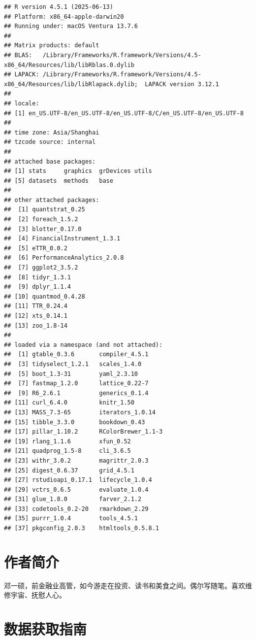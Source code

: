 \documentclass[]{ctexbook}
\begin{document}
\begin{verbatim}
## R version 4.5.1 (2025-06-13)
## Platform: x86_64-apple-darwin20
## Running under: macOS Ventura 13.7.6
## 
## Matrix products: default
## BLAS:   /Library/Frameworks/R.framework/Versions/4.5-x86_64/Resources/lib/libRblas.0.dylib 
## LAPACK: /Library/Frameworks/R.framework/Versions/4.5-x86_64/Resources/lib/libRlapack.dylib;  LAPACK version 3.12.1
## 
## locale:
## [1] en_US.UTF-8/en_US.UTF-8/en_US.UTF-8/C/en_US.UTF-8/en_US.UTF-8
## 
## time zone: Asia/Shanghai
## tzcode source: internal
## 
## attached base packages:
## [1] stats     graphics  grDevices utils    
## [5] datasets  methods   base     
## 
## other attached packages:
##  [1] quantstrat_0.25           
##  [2] foreach_1.5.2             
##  [3] blotter_0.17.0            
##  [4] FinancialInstrument_1.3.1 
##  [5] eTTR_0.0.2                
##  [6] PerformanceAnalytics_2.0.8
##  [7] ggplot2_3.5.2             
##  [8] tidyr_1.3.1               
##  [9] dplyr_1.1.4               
## [10] quantmod_0.4.28           
## [11] TTR_0.24.4                
## [12] xts_0.14.1                
## [13] zoo_1.8-14                
## 
## loaded via a namespace (and not attached):
##  [1] gtable_0.3.6       compiler_4.5.1    
##  [3] tidyselect_1.2.1   scales_1.4.0      
##  [5] boot_1.3-31        yaml_2.3.10       
##  [7] fastmap_1.2.0      lattice_0.22-7    
##  [9] R6_2.6.1           generics_0.1.4    
## [11] curl_6.4.0         knitr_1.50        
## [13] MASS_7.3-65        iterators_1.0.14  
## [15] tibble_3.3.0       bookdown_0.43     
## [17] pillar_1.10.2      RColorBrewer_1.1-3
## [19] rlang_1.1.6        xfun_0.52         
## [21] quadprog_1.5-8     cli_3.6.5         
## [23] withr_3.0.2        magrittr_2.0.3    
## [25] digest_0.6.37      grid_4.5.1        
## [27] rstudioapi_0.17.1  lifecycle_1.0.4   
## [29] vctrs_0.6.5        evaluate_1.0.4    
## [31] glue_1.8.0         farver_2.1.2      
## [33] codetools_0.2-20   rmarkdown_2.29    
## [35] purrr_1.0.4        tools_4.5.1       
## [37] pkgconfig_2.0.3    htmltools_0.5.8.1
\end{verbatim}

\chapter*{作者简介}\label{author}


邓一硕，前金融业高管，如今游走在投资、读书和美食之间。偶尔写随笔。喜欢维修宇宙、抚慰人心。

\mainmatter

\chapter{数据获取指南}\label{data}
\end{document}
